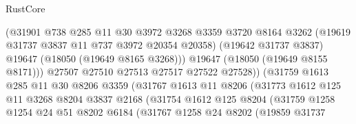 \begin{lexlean}{RustCore}
\begin{coremodule}
                                    (@31901
                                      @738
                                      @285
                                      @11
                                      @30
                                      @3972
                                      @3268
                                      @3359
                                      @3720
                                      @8164
                                      @3262
                                      (@19619 @31737 @3837 @11 @737 @3972 @20354 @20358)
                                      (@19642 @31737 @3837)
                                      @19647
                                      (@18050 (@19649 @8165 @3268)))
                                    @19647
                                    (@18050 (@19649 @8155 @8171)))
                                  @27507
                                  @27510
                                  @27513
                                  @27517
                                  @27522
                                  @27528))
                              (@31759
                                @1613
                                @285
                                @11
                                @30
                                @8206
                                @3359
                                (@31767
                                  @1613
                                  @11
                                  @8206
                                  (@31773
                                    @1612
                                    @125
                                    @11
                                    @3268
                                    @8204
                                    @3837
                                    @2168
                                    (@31754
                                      @1612
                                      @125
                                      @8204
                                      (@31759
                                        @1258
                                        @1254
                                        @24
                                        @51
                                        @8202
                                        @6184
                                        (@31767
                                          @1258
                                          @24
                                          @8202
                                          (@19859
                                            @31737

\end{coremodule}
\end{lexlean}
